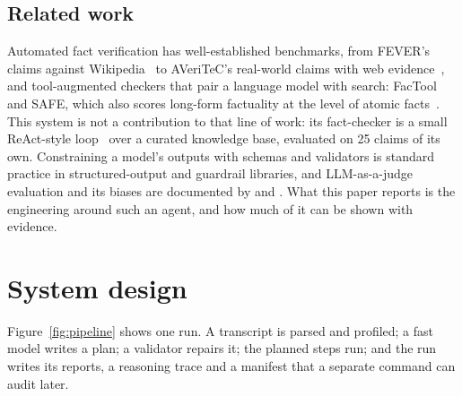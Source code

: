 \documentclass[11pt]{article}
\begin{document}
\subsection{Related work}\label{sec:related}
Automated fact verification has well-established benchmarks, from FEVER's claims against Wikipedia~\citep{thorne2018fever} to AVeriTeC's real-world claims with web evidence~\citep{schlichtkrull2023averitec}, and tool-augmented checkers that pair a language model with search: FacTool~\citep{chern2023factool} and SAFE, which also scores long-form factuality at the level of atomic facts~\citep{wei2024longform,min2023factscore}. This system is not a contribution to that line of work: its fact-checker is a small ReAct-style loop~\citep{yao2023react} over a curated knowledge base, evaluated on 25 claims of its own. Constraining a model's outputs with schemas and validators is standard practice in structured-output and guardrail libraries, and LLM-as-a-judge evaluation and its biases are documented by \citet{zheng2023judging} and \citet{panickssery2024}. What this paper reports is the engineering around such an agent, and how much of it can be shown with evidence.

\section{System design}\label{sec:design}

Figure~\ref{fig:pipeline} shows one run. A transcript is parsed and profiled; a fast model writes a plan; a validator repairs it; the planned steps run; and the run writes its reports, a reasoning trace and a manifest that a separate command can audit later.
\end{document}
